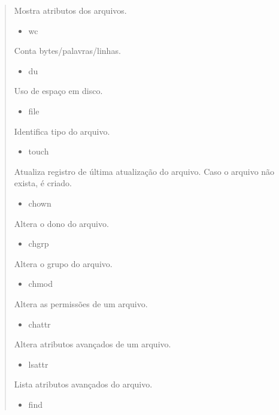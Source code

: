 \documentclass[a4paper,10pt,portuguese]{sphinxmanual}
\begin{document}
\begin{quote}
\begin{description}
Mostra atributos dos arquivos.
\begin{itemize}
\item {} 
wc

\end{itemize}

Conta bytes/palavras/linhas.
\begin{itemize}
\item {} 
du

\end{itemize}

Uso de espaço em disco.
\begin{itemize}
\item {} 
file

\end{itemize}

Identifica tipo do arquivo.
\begin{itemize}
\item {} 
touch

\end{itemize}

Atualiza registro de última atualização do arquivo. Caso o
arquivo não exista, é criado.
\begin{itemize}
\item {} 
chown

\end{itemize}

Altera o dono do arquivo.
\begin{itemize}
\item {} 
chgrp

\end{itemize}

Altera o grupo do arquivo.
\begin{itemize}
\item {} 
chmod

\end{itemize}

Altera as permissões de um arquivo.
\begin{itemize}
\item {} 
chattr

\end{itemize}

Altera atributos avançados de um arquivo.
\begin{itemize}
\item {} 
lsattr

\end{itemize}

Lista atributos avançados do arquivo.
\begin{itemize}
\item {} 
find


\end{itemize}
\end{description}
\end{quote}
\end{document}
